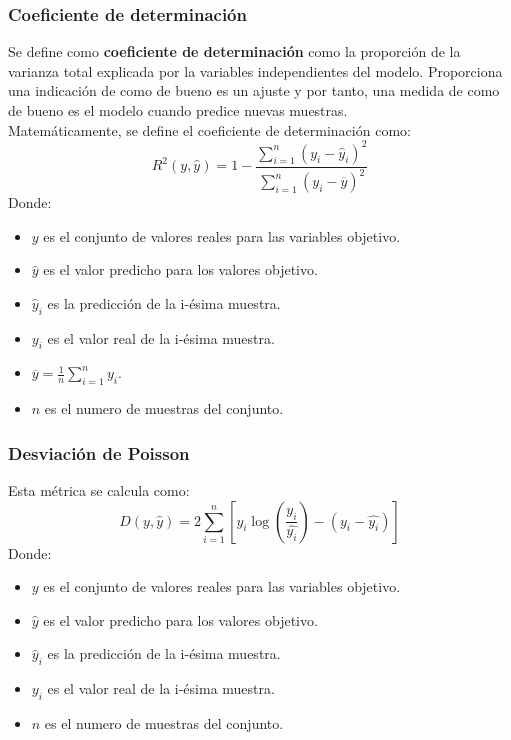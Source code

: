 \subsubsection*{Coeficiente de determinación}
Se define como \textbf{coeficiente de determinación} como la proporción de la varianza total explicada por la variables independientes del modelo. Proporciona una indicación de como de bueno es un ajuste y por tanto, una medida de como de bueno es el modelo cuando predice nuevas muestras.\\
\linebreak
Matemáticamente, se define el coeficiente de determinación como:
\[R^2 (y, \hat{y}) = 1 - \frac{\sum_{i=1}^{n}(y_i - \hat{y}_i)^2}    {\sum_{i=1}^{n} (y_i - \overline{y})^2}\]
Donde:
\begin{itemize}
	\item $y$ es el conjunto de valores reales para las variables objetivo.
	\item $\hat{y}$ es el valor predicho para los valores objetivo.
	\item $\hat{y}_i$ es la predicción de la i-ésima muestra.
	\item $y_i$ es el valor real de la i-ésima muestra.
	\item $\overline{y} = \frac{1}{n} \sum_{i=1}^{n} y_i$.
	\item $n$ es el numero de muestras del conjunto.
\end{itemize}
\subsubsection*{Desviación de Poisson}
Esta métrica se calcula como: 
\[
D(y,\hat{y}) = 2\sum_{i=1}^{n}[y_i\log(\frac{y_i}{\hat{y_i}}) - (y_i-\hat{y_i})]
\]
Donde:
\begin{itemize}
	\item $y$ es el conjunto de valores reales para las variables objetivo.
	\item $\hat{y}$ es el valor predicho para los valores objetivo.
	\item $\hat{y}_i$ es la predicción de la i-ésima muestra.
	\item $y_i$ es el valor real de la i-ésima muestra.
	\item $n$ es el numero de muestras del conjunto.
\end{itemize}

